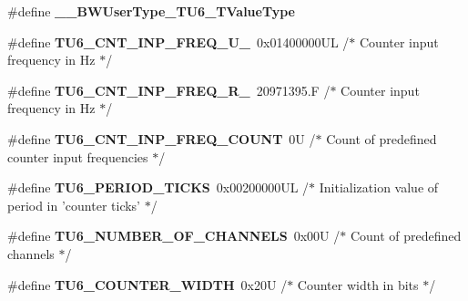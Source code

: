 \begin{DoxyCompactItemize}
\item 
\hypertarget{group___t_u6__module_ga0c4e731d6cc855623fe3a6e54c9336e9}{\#define {\bfseries \-\_\-\-\_\-\-B\-W\-User\-Type\-\_\-\-T\-U6\-\_\-\-T\-Value\-Type}}\label{group___t_u6__module_ga0c4e731d6cc855623fe3a6e54c9336e9}

\item 
\hypertarget{group___t_u6__module_ga5e953ab2d56c852ed67a126ba1f6d0e0}{\#define {\bfseries T\-U6\-\_\-\-C\-N\-T\-\_\-\-I\-N\-P\-\_\-\-F\-R\-E\-Q\-\_\-\-U\-\_}~0x01400000\-U\-L /$\ast$ Counter input frequency in Hz $\ast$/}\label{group___t_u6__module_ga5e953ab2d56c852ed67a126ba1f6d0e0}

\item 
\hypertarget{group___t_u6__module_gab6b6c2865daad94825c6a711e39a4845}{\#define {\bfseries T\-U6\-\_\-\-C\-N\-T\-\_\-\-I\-N\-P\-\_\-\-F\-R\-E\-Q\-\_\-\-R\-\_}~20971395.\-F /$\ast$ Counter input frequency in Hz $\ast$/}\label{group___t_u6__module_gab6b6c2865daad94825c6a711e39a4845}

\item 
\hypertarget{group___t_u6__module_gaf916aca017c069cd1f433bf6ea2de12e}{\#define {\bfseries T\-U6\-\_\-\-C\-N\-T\-\_\-\-I\-N\-P\-\_\-\-F\-R\-E\-Q\-\_\-\-C\-O\-U\-N\-T}~0\-U      /$\ast$ Count of predefined counter input frequencies $\ast$/}\label{group___t_u6__module_gaf916aca017c069cd1f433bf6ea2de12e}

\item 
\hypertarget{group___t_u6__module_gaf52e9b8119f5d85d6aea862b48454164}{\#define {\bfseries T\-U6\-\_\-\-P\-E\-R\-I\-O\-D\-\_\-\-T\-I\-C\-K\-S}~0x00200000\-U\-L /$\ast$ Initialization value of period in 'counter ticks' $\ast$/}\label{group___t_u6__module_gaf52e9b8119f5d85d6aea862b48454164}

\item 
\hypertarget{group___t_u6__module_ga30eb323181f1fe2484fa7c3c7203a9f0}{\#define {\bfseries T\-U6\-\_\-\-N\-U\-M\-B\-E\-R\-\_\-\-O\-F\-\_\-\-C\-H\-A\-N\-N\-E\-L\-S}~0x00\-U   /$\ast$ Count of predefined channels $\ast$/}\label{group___t_u6__module_ga30eb323181f1fe2484fa7c3c7203a9f0}

\item 
\hypertarget{group___t_u6__module_ga4642520f1c6a62aeb33546be5870fe9f}{\#define {\bfseries T\-U6\-\_\-\-C\-O\-U\-N\-T\-E\-R\-\_\-\-W\-I\-D\-T\-H}~0x20\-U       /$\ast$ Counter width in bits  $\ast$/}\label{group___t_u6__module_ga4642520f1c6a62aeb33546be5870fe9f}


\end{DoxyCompactItemize}
